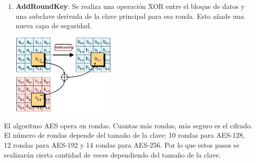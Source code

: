 \documentclass[a4paper, 12pt]{article}
\begin{document}
\begin{enumerate}
\item \textbf{AddRoundKey}: Se realiza una operación XOR entre el bloque de datos y una subclave derivada de la clave principal para esa ronda. Esto añade una nueva capa de seguridad.

\begin{center}
	\includegraphics[width=0.4\textwidth]{images/AddRoundKey.png}
\end{center}

\end{enumerate}

El algoritmo AES opera en rondas. Cuantas más rondas, más seguro es el cifrado. El número de rondas depende del tamaño de la clave: 10 rondas para AES-128, 12 rondas para AES-192 y 14 rondas para AES-256. Por lo que estos pasos se realizarán cierta cantidad de veces dependiendo del tamaño de la clave.
\end{document}
